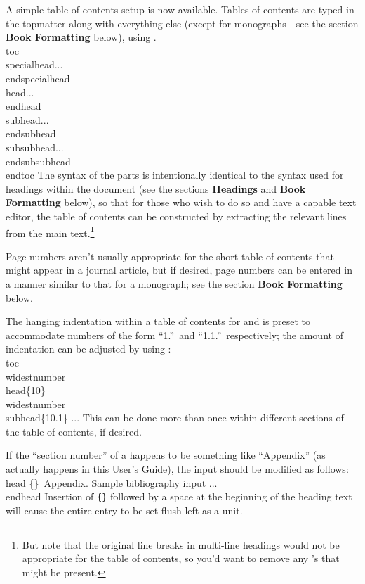 A simple table of contents setup is now available.  Tables of contents
are typed in the topmatter along with everything else (except for
monographs---see the section {\bf Book Formatting} below), using
.
\beginexample{}
\\toc
\\specialhead...\\endspecialhead
\\head...\\endhead
\\subhead...\\endsubhead
\\subsubhead...\\endsubsubhead
\\endtoc
\endexample
\noindent
The syntax of the parts is intentionally identical to the syntax used
for headings within the document (see the sections {\bf Headings} and
{\bf Book Formatting} below), so that for those who wish to do so
and have a capable text editor, the table of contents can be constructed
by extracting the relevant lines from the main text.\footnote{But note that
the original line breaks in multi-line headings would not be appropriate
for the table of contents, so you'd want to remove any \ttcs{\\}'s that
might be present.}

Page numbers aren't usually appropriate for the short table of contents
that might appear in a journal article, but if desired, page numbers can
be entered in a manner similar to that for a monograph; see the section
{\bf Book Formatting} below.

The hanging indentation within a table of contents for  and
 is preset to accommodate numbers of the form
``1.''\ and ``1.1.''\ respectively; the amount of indentation can
be adjusted by using :
\beginexample{}
\\toc
\\widestnumber\\head\{10\}
\\widestnumber\\subhead\{10.1\}
...
\endexample
\noindent This can be done more than once within different sections of
the table of contents, if desired.

If the ``section number'' of a  happens to be something like
``Appendix'' (as actually happens in this User's Guide), the input should
be modified as follows:
\beginexample{}
\\head \{\}\ Appendix. Sample bibliography input ...\\endhead
\endexample
\noindent
Insertion of {\tt\{\}} followed by a space at the beginning of the heading
text will cause the entire entry to be set flush left as a unit.

